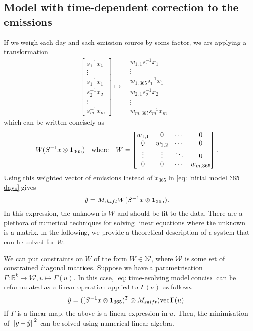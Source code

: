 \documentclass{article}
\begin{document}
\subsection{Model with time-dependent correction to the emissions}
If we weigh each day and each emission source by some factor, we are applying a transformation
$$
\begin{bmatrix}
    s_1^{-1} x_1 \\
    \vdots \\
    s_1^{-1} x_1 \\ 
    s_2^{-1} x_2 \\
    \vdots \\ 
    s_m^{-1} x_m
\end{bmatrix}
\mapsto
\begin{bmatrix}
    w_{1,1} s_1^{-1} x_1 \\
    \vdots \\
    w_{1,365} s_1^{-1} x_1 \\ 
    w_{2,1} s_2^{-1} x_2 \\
    \vdots \\ 
    w_{m, 365} s_m^{-1} x_m
\end{bmatrix}
$$
which can be written concisely as 
$$
W (S^{-1} x \otimes \vb{1}_{365})
\quad\text{where}\quad 
W = \begin{bmatrix}
    w_{1,1} & 0 & \cdots & 0 \\
    0 & w_{1,2} & \cdots & 0 \\
    \vdots & \vdots & \ddots & 0 \\
    0 & 0 & \cdots & w_{m, 365}
\end{bmatrix}
.$$
Using this weighted vector of emissions instead of $\tilde{x}_{365}$ in \cref{eq: initial model 365 days} gives
\begin{equation}
    \label{eq: time-evolving model concise}
\hat{y} = M_{shift} W (S^{-1} x \otimes \vb{1}_{365})
.\end{equation}
In this expression, the unknown is $W$ and should be fit to the data. 
There are a plethora of numerical techniques for solving linear equations where the unknown is a matrix.
In the following, we provide a theoretical description of a system that can be solved for $W$.

We can put constraints on $W$ of the form $W \in \mathcal{W}$, where $\mathcal{W}$ is some set of constrained diagonal matrices. Suppose we have a parametrisation $\Gamma: \mathbb{R}^{k} \rightarrow \mathcal{W}, u \mapsto \Gamma(u)$. 
In this case, \cref{eq: time-evolving model concise} can be reformulated as a linear operation applied to $\Gamma(u)$ as follows:
$$
\hat{y} = ((S^{-1} x \otimes \vb{1}_{365})^T \otimes M_{shift}) \mathrm{vec}\, \Gamma(u)
.$$
If $\Gamma$ is a linear map, the above is a linear expression in $u$. Then, the minimisation of $\norm{y - \hat{y}}^2$ can be solved using numerical linear algebra.


\printbibliography
\end{document}
